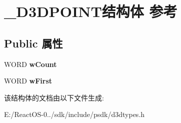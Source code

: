 \hypertarget{struct___d3_d_p_o_i_n_t}{}\section{\+\_\+\+D3\+D\+P\+O\+I\+N\+T结构体 参考}
\label{struct___d3_d_p_o_i_n_t}
\subsection*{Public 属性}
\begin{DoxyCompactItemize}
\item 
\mbox{\label{struct___d3_d_p_o_i_n_t_a5ecf82dc1073a4bd3e2973360a97e254}} 
W\+O\+RD {\bfseries w\+Count}
\item 
\mbox{\label{struct___d3_d_p_o_i_n_t_a13f1343ffb86747ad1a83f246f71bae3}} 
W\+O\+RD {\bfseries w\+First}
\end{DoxyCompactItemize}


该结构体的文档由以下文件生成\+:\begin{DoxyCompactItemize}
\item 
E\+:/\+React\+O\+S-\/0../sdk/include/psdk/d3dtypes.\+h\end{DoxyCompactItemize}
